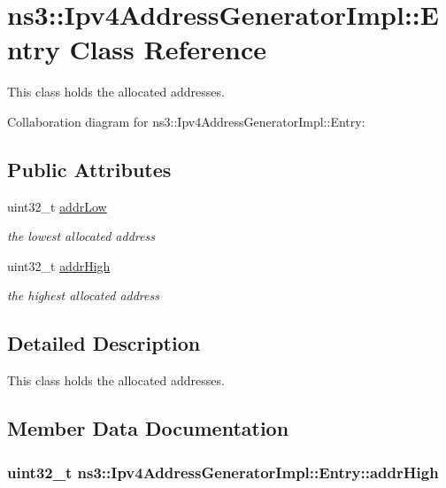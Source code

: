 \hypertarget{classns3_1_1Ipv4AddressGeneratorImpl_1_1Entry}{}\section{ns3\+:\+:Ipv4\+Address\+Generator\+Impl\+:\+:Entry Class Reference}
\label{classns3_1_1Ipv4AddressGeneratorImpl_1_1Entry}


This class holds the allocated addresses.  




Collaboration diagram for ns3\+:\+:Ipv4\+Address\+Generator\+Impl\+:\+:Entry\+:
\subsection*{Public Attributes}
\begin{DoxyCompactItemize}
\item 
uint32\+\_\+t \hyperlink{classns3_1_1Ipv4AddressGeneratorImpl_1_1Entry_ad487bc977854de4205bee87a2caafdd7}{addr\+Low}
\begin{DoxyCompactList}\small\item\em the lowest allocated address \end{DoxyCompactList}\item 
uint32\+\_\+t \hyperlink{classns3_1_1Ipv4AddressGeneratorImpl_1_1Entry_ad251485a33870f995d4a9e86262d2c68}{addr\+High}
\begin{DoxyCompactList}\small\item\em the highest allocated address \end{DoxyCompactList}\end{DoxyCompactItemize}


\subsection{Detailed Description}
This class holds the allocated addresses. 

\subsection{Member Data Documentation}
\subsubsection[{\texorpdfstring{addr\+High}{addrHigh}}]{\setlength{\rightskip}{0pt plus 5cm}uint32\+\_\+t ns3\+::\+Ipv4\+Address\+Generator\+Impl\+::\+Entry\+::addr\+High}\hypertarget{classns3_1_1Ipv4AddressGeneratorImpl_1_1Entry_ad251485a33870f995d4a9e86262d2c68}{}\label{classns3_1_1Ipv4AddressGeneratorImpl_1_1Entry_ad251485a33870f995d4a9e86262d2c68}


